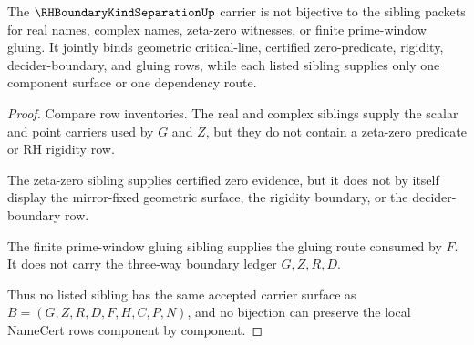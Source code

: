\begin{theorem}\label{thm:rh-boundary-kind-separation-sibling-separation}
The $\RHBoundaryKindSeparationUp$ carrier is not bijective to the sibling packets for real names, complex names, zeta-zero witnesses, or finite prime-window gluing. It jointly binds geometric critical-line, certified zero-predicate, rigidity, decider-boundary, and gluing rows, while each listed sibling supplies only one component surface or one dependency route.
\end{theorem}
\begin{proof}
Compare row inventories. The real and complex siblings supply the scalar and point carriers used by $G$ and $Z$, but they do not contain a zeta-zero predicate or RH rigidity row.

The zeta-zero sibling supplies certified zero evidence, but it does not by itself display the mirror-fixed geometric surface, the rigidity boundary, or the decider-boundary row.

The finite prime-window gluing sibling supplies the gluing route consumed by $F$. It does not carry the three-way boundary ledger $G,Z,R,D$.

Thus no listed sibling has the same accepted carrier surface as $B=(G,Z,R,D,F,H,C,P,N)$, and no bijection can preserve the local NameCert rows component by component.
\end{proof}




